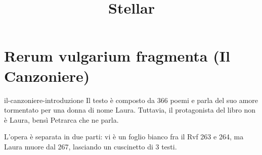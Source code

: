 \documentclass[preview]{standalone}
\begin{document}
\title{Stellar}
\genpage

\section{Rerum vulgarium fragmenta (Il Canzoniere)}

\begin{snippet}{il-canzoniere-introduzione}
    Il testo è composto da 366 poemi e parla del suo amore tormentato per una donna di nome Laura.
    Tuttavia, il protagonista del libro non è Laura, bensì Petrarca che ne parla.
    
    L'opera è separata in due parti: vi è un foglio bianco fra il Rvf 263 e 264,
    ma Laura muore dal 267, lasciando un cuscinetto di 3 testi.
\end{snippet}
\end{document}
